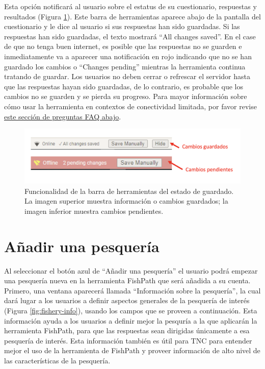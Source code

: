 \documentclass[
  11pt,
]{book}
\begin{document}
Esta opción notificará al usuario sobre el estatus de su cuestionario, respuestas y resultados (Figura \ref{fig:saving-status}). Este barra de herramientas aparece abajo de la pantalla del cuestionario y le dice al usuario si sus respuestas han sido guardadas. Si las respuestas han sido guardadas, el texto mostrará ``All changes saved''. En el case de que no tenga buen internet, es posible que las respuestas no se guarden e inmediatamente va a aparecer una notificación en rojo indicando que no se han guardado los cambios o ``Changes pending'' mientras la herramienta continua tratando de guardar. Los usuarios no deben cerrar o refrescar el servidor hasta que las respuestas hayan sido guardadas, de lo contrario, es probable que los cambios no se guarden y se pierda su progreso. Para mayor información sobre cómo usar la herramienta en contextos de conectividad limitada, por favor revise \protect\hyperlink{faq-internet}{este sección de preguntas FAQ abajo}.

\begin{figure}

{\centering \includegraphics[width=0.95\linewidth]{images/saving-status-toolbar-es} 

}

\caption{Funcionalidad de la barra de herramientas del estado de guardado. La imagen superior muestra información o cambios guardados; la imagen inferior muestra cambios pendientes.}\label{fig:saving-status}
\end{figure}

\hypertarget{auxf1adir-una-pesqueruxeda}{%
\section{Añadir una pesquería}\label{auxf1adir-una-pesqueruxeda}}

Al seleccionar el botón azul de ``Añadir una pesquería'' el usuario podrá empezar una pesquería nueva en la herramienta FishPath que será añadida a su cuenta. Primero, una ventana aparecerá llamada ``Información sobre la pesquería'', la cual dará lugar a los usuarios a definir aspectos generales de la pesquería de interés (Figura \ref{fig:fishery-info}), usando los campos que se proveen a continuación. Esta información ayuda a los usuarios a definir mejor la pesquría a la que aplicarán la herramienta FishPath, para que las respuestas sean dirigidas únicamente a esa pesquería de interés. Esta información también es útil para TNC para entender mejor el uso de la herramienta de FishPath y proveer información de alto nivel de las características de la pesquería.
\end{document}
